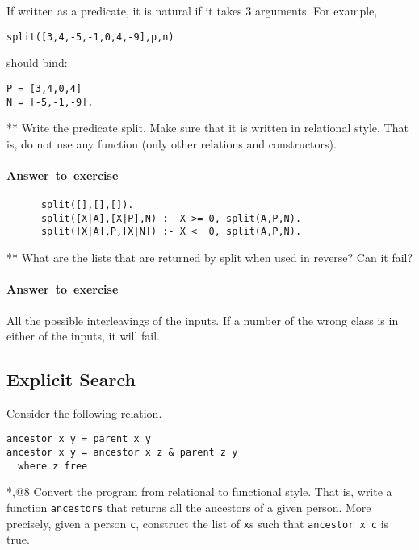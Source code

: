 \documentclass{article}
\newcounter{question}
\newenvironment{ans}{\begin{oframed}\paragraph{Answer~to~exercise~\arabic{question}}}{\end{oframed}}
\begin{document}
If written as a predicate, it is natural if it takes 3 arguments. For example,

\begin{verbatim}
split([3,4,-5,-1,0,4,-9],p,n)
\end{verbatim}

should bind:

\begin{verbatim}
P = [3,4,0,4]
N = [-5,-1,-9].
\end{verbatim}


\begin{question}{**}
  Write the predicate \textsf{split}. Make sure that it is written in
  relational style. That is, do not use any function (only other
  relations and constructors).
  \begin{ans}

    \begin{verbatim}
      split([],[],[]).
      split([X|A],[X|P],N) :- X >= 0, split(A,P,N).
      split([X|A],P,[X|N]) :- X <  0, split(A,P,N).
    \end{verbatim}
  \end{ans}
\end{question}

\begin{question}{**}
    What are the lists that are returned by \textsf{split} when used in reverse? Can it fail?
    \begin{ans}
      All the possible interleavings of the inputs. If a number of the wrong class is
      in either of the inputs, it will fail.
    \end{ans}
\end{question}

\subsection{Explicit Search}

Consider the following relation.
\begin{verbatim}
ancestor x y = parent x y
ancestor x y = ancestor x z & parent z y
  where z free
\end{verbatim}

\begin{question}{*,@8}
Convert the program from relational to functional style. That is,
write a function \texttt{ancestors} that returns all the ancestors of
a given person.  More precisely, given a person \texttt{c}, construct the
list of \texttt{x}s such that \texttt{ancestor x c} is true.
\end{question}
\end{document}
